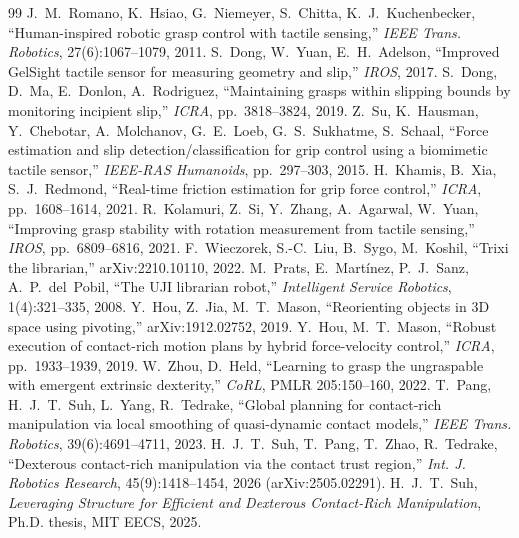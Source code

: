 \documentclass[10pt]{article}
\begin{document}
{\footnotesize
\begin{thebibliography}{99}\setlength{\itemsep}{0pt}\setlength{\parskip}{0pt}
 J.~M.~Romano, K.~Hsiao, G.~Niemeyer, S.~Chitta, K.~J.~Kuchenbecker, ``Human-inspired robotic grasp control with tactile sensing,'' \emph{IEEE Trans. Robotics}, 27(6):1067--1079, 2011.
 S.~Dong, W.~Yuan, E.~H.~Adelson, ``Improved GelSight tactile sensor for measuring geometry and slip,'' \emph{IROS}, 2017.
 S.~Dong, D.~Ma, E.~Donlon, A.~Rodriguez, ``Maintaining grasps within slipping bounds by monitoring incipient slip,'' \emph{ICRA}, pp.~3818--3824, 2019.
 Z.~Su, K.~Hausman, Y.~Chebotar, A.~Molchanov, G.~E.~Loeb, G.~S.~Sukhatme, S.~Schaal, ``Force estimation and slip detection/classification for grip control using a biomimetic tactile sensor,'' \emph{IEEE-RAS Humanoids}, pp.~297--303, 2015.
 H.~Khamis, B.~Xia, S.~J.~Redmond, ``Real-time friction estimation for grip force control,'' \emph{ICRA}, pp.~1608--1614, 2021.
 R.~Kolamuri, Z.~Si, Y.~Zhang, A.~Agarwal, W.~Yuan, ``Improving grasp stability with rotation measurement from tactile sensing,'' \emph{IROS}, pp.~6809--6816, 2021.
 F.~Wieczorek, S.-C.~Liu, B.~Sygo, M.~Koshil, ``Trixi the librarian,'' arXiv:2210.10110, 2022.
 M.~Prats, E.~Mart\'inez, P.~J.~Sanz, A.~P.~del~Pobil, ``The UJI librarian robot,'' \emph{Intelligent Service Robotics}, 1(4):321--335, 2008.
 Y.~Hou, Z.~Jia, M.~T.~Mason, ``Reorienting objects in 3D space using pivoting,'' arXiv:1912.02752, 2019.
 Y.~Hou, M.~T.~Mason, ``Robust execution of contact-rich motion plans by hybrid force-velocity control,'' \emph{ICRA}, pp.~1933--1939, 2019.
 W.~Zhou, D.~Held, ``Learning to grasp the ungraspable with emergent extrinsic dexterity,'' \emph{CoRL}, PMLR 205:150--160, 2022.
 T.~Pang, H.~J.~T.~Suh, L.~Yang, R.~Tedrake, ``Global planning for contact-rich manipulation via local smoothing of quasi-dynamic contact models,'' \emph{IEEE Trans. Robotics}, 39(6):4691--4711, 2023.
 H.~J.~T.~Suh, T.~Pang, T.~Zhao, R.~Tedrake, ``Dexterous contact-rich manipulation via the contact trust region,'' \emph{Int. J. Robotics Research}, 45(9):1418--1454, 2026 (arXiv:2505.02291).
 H.~J.~T.~Suh, \emph{Leveraging Structure for Efficient and Dexterous Contact-Rich Manipulation}, Ph.D. thesis, MIT EECS, 2025.

\end{thebibliography}}
\end{document}

